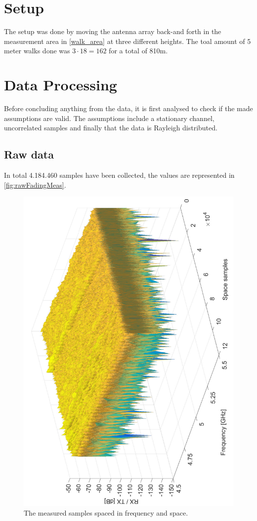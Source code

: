 \section{Setup}
The setup was done by moving the antenna array back-and forth in the measurement area in \autoref{walk_area} at three different heights. The toal amount of 5 meter walks done was $3 \cdot 18 = 162$ for a total of 810m.



\section{Data Processing}

Before concluding anything from the data, it is first analysed to check if the made assumptions are valid. The assumptions include a stationary channel, uncorrelated samples and finally that the data is Rayleigh distributed.

\subsection{Raw data}

In total 4.184.460 samples have been collected, the values are represented in \autoref{fig:rawFadingMeas}.

\begin{figure}[H]
\centering
\includegraphics[height = \textwidth, angle = -90]{figures/rawFadingMeas.pdf}
\caption{The measured samples spaced in frequency and space.}
\label{fig:rawFadingMeas}
\end{figure}


